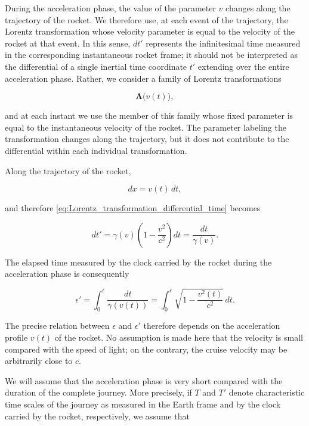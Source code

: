 \documentclass[12pt]{article}
\begin{document}
During the acceleration phase, the value of the parameter $v$ changes along the
trajectory of the rocket. We therefore use, at each event of the trajectory, the
Lorentz transformation whose velocity parameter is equal to the velocity of the rocket
at that event. In this sense, $dt'$ represents the infinitesimal time measured in the
corresponding instantaneous rocket frame; it should not be interpreted as the
differential of a single inertial time coordinate $t'$ extending over the entire
acceleration phase. Rather, we consider a family of Lorentz
transformations

\[
  \boldsymbol{\Lambda}\bigl(v(t)\bigr),
\]

and at each instant we use the member of this family whose fixed parameter is equal to
the instantaneous velocity of the rocket. The parameter labeling the transformation
changes along the trajectory, but it does not contribute to the differential within
each individual transformation.  \par
Along the trajectory of the rocket,

\[
  dx=v(t)\,dt,
\]

and therefore \eqref{eq:Lorentz_transformation_differential_time} becomes

\begin{equation}
  dt'
  =
  \gamma(v)
  \left(
    1-\frac{v^2}{c^2}
  \right)dt
  =
  \frac{dt}{\gamma(v)}.
  \label{eq:rocket_clock_differential}
\end{equation}

The elapsed time measured by the clock carried by the rocket during the acceleration
phase is consequently

\begin{equation}
  \epsilon'
  =
  \int_0^\epsilon
  \frac{dt}{\gamma(v(t))}
  =
  \int_0^\epsilon
  \sqrt{1-\frac{v^2(t)}{c^2}}\,dt.
  \label{eq:acceleration_elapsed_time}
\end{equation}

The precise relation between $\epsilon$ and $\epsilon'$ therefore depends on the
acceleration profile $v(t)$ of the rocket. No assumption is made here that the velocity
is small compared with the speed of light; on the contrary, the cruise velocity may
be arbitrarily close to $c$. \par


We will assume that the acceleration phase is very short compared with the duration
of the complete journey. More precisely, if $T$ and $T'$ denote characteristic time
scales of the journey as measured in the Earth frame and by the clock carried by the
rocket, respectively, we assume that
\end{document}
